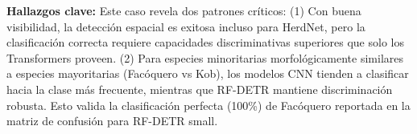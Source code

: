 \textbf{Hallazgos clave:} Este caso revela dos patrones críticos: (1) Con buena visibilidad, la detección espacial es exitosa incluso para HerdNet, pero la clasificación correcta requiere capacidades discriminativas superiores que solo los Transformers proveen. (2) Para especies minoritarias morfológicamente similares a especies mayoritarias (Facóquero vs Kob), los modelos CNN tienden a clasificar hacia la clase más frecuente, mientras que RF-DETR mantiene discriminación robusta. Esto valida la clasificación perfecta (100\%) de Facóquero reportada en la matriz de confusión para RF-DETR small.
